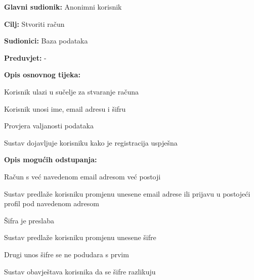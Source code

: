 \noindent {}
\begin{packed_item}

\item \textbf{Glavni sudionik:} Anonimni korisnik
\item  \textbf{Cilj:} Stvoriti račun
\item  \textbf{Sudionici:} Baza podataka
\item  \textbf{Preduvjet:} -
\item  \textbf{Opis osnovnog tijeka:}

\item[] \begin{packed_enum}

    \item Korisnik ulazi u sučelje za stvaranje računa
    \item Korisnik unosi ime, email adresu i šifru
    \item Provjera valjanosti podataka
    \item Sustav dojavljuje korisniku kako je registracija uspješna

\end{packed_enum}

\item  \textbf{Opis mogućih odstupanja:}

\item[] \begin{packed_item}

    \item[3.a] Račun s već navedenom email adresom već postoji

    \item[] \begin{packed_enum}

        \item Sustav predlaže korisniku promjenu unesene email adrese ili prijavu u postojeći profil pod navedenom adresom

    \end{packed_enum}

\item[3.b] Šifra je preslaba

\item[] \begin{packed_enum}

    \item Sustav predlaže korisniku promjenu unesene šifre

\end{packed_enum}

    \item[3.c] Drugi unos šifre se ne podudara s prvim

    \item[] \begin{packed_enum}

        \item Sustav obavještava korisnika da se šifre razlikuju

    \end{packed_enum}

\end{packed_item}

\end{packed_item}


